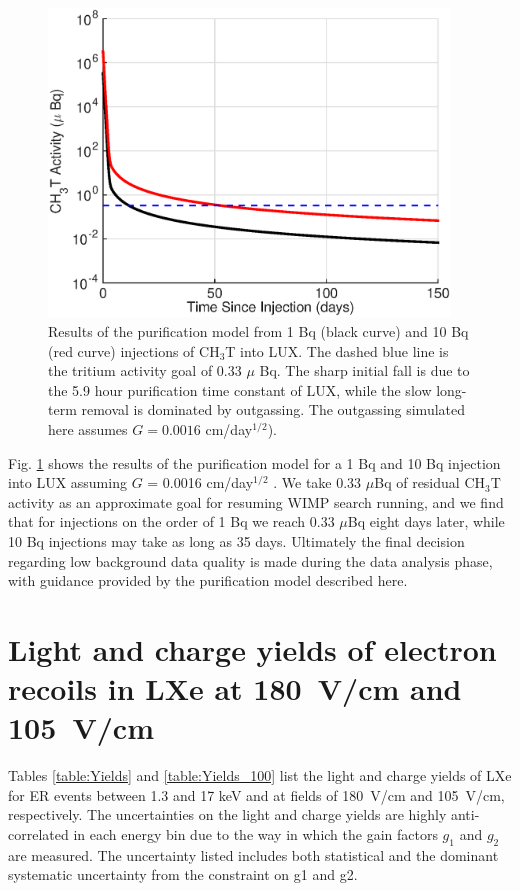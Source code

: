 \begin{figure}[h!]
\includegraphics[width=0.95\textwidth]{fig/LUX_og_lim.eps}
\caption{Results of the purification model from 1 Bq (black curve) and 10 Bq (red curve) injections of CH$_3$T into LUX. The dashed blue line is the tritium activity goal of 0.33 $\mu$ Bq. The sharp initial fall is due to the 5.9 hour purification time constant of LUX, while the slow long-term removal is dominated by outgassing. The outgassing simulated here assumes  $G=0.0016$ cm/day$^{1/2}$).}
\label{fig:tau_var}
\end{figure}

Fig. \ref{fig:tau_var} shows the results of the purification model for a 1 Bq and 10 Bq injection into LUX assuming $G$ = 0.0016 cm/day$^{1/2}$  . We take 0.33 $\mu$Bq of residual CH$_3$T activity as an approximate goal for resuming WIMP search running, and we find that for injections on the order of 1 Bq we reach 0.33 $\mu$Bq eight days later, while 10 Bq injections may take as long as 35 days.  Ultimately the final decision regarding low background data quality is made during the data analysis phase, with guidance provided by the purification model described here.

\section{Light and charge yields of electron recoils in LXe at 180~V/cm and 105~V/cm}
\label{sec:appendix3}

Tables \ref{table:Yields} and \ref{table:Yields_100} list the light and charge yields of LXe for ER events between 1.3 and 17 keV and at fields of 180~V/cm and 105~V/cm, respectively. The uncertainties on the light and charge yields are highly anti-correlated in each energy bin due to the way in which the gain factors $g_1$ and $g_2$ are measured. The uncertainty listed includes both statistical and the dominant systematic uncertainty from the constraint on g1 and g2.

